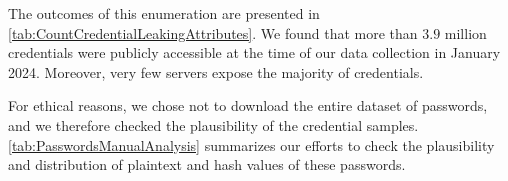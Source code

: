 The outcomes of this enumeration are presented in \cref{tab:CountCredentialLeakingAttributes}. We found that more than $3.9$ million credentials were publicly accessible at the time of our data collection in January 2024. 
Moreover, %
very few servers expose the majority of credentials.


For ethical reasons, we chose not to download the entire dataset of passwords, and we therefore checked the plausibility of the credential samples. \cref{tab:PasswordsManualAnalysis} summarizes our efforts to check the plausibility and distribution of plaintext and hash values of these passwords.




